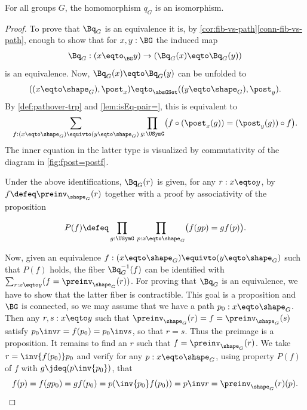 \begin{lemma}
  \label{lem:Groupsareidentitytypes}
For all groups $G$, the homomorphism $q_G$ is an isomorphism.
\end{lemma}
\begin{proof}
  To prove that $\Bq_G$ is an equivalence it is, by \cref{cor:fib-vs-path}\ref{conn-fib-vs-path}, enough to show that for $x,y:\BG$ the induced map
$$\Bq_G:(x\eqto_{\BG}y)\to (\Bq_G(x)\eqto \Bq_G(y))
$$
is an equivalence.
  Now, $\Bq_G(x)\eqto \Bq_G(y)$ can be unfolded to
$$
((x\eqto \sh_G),\post_x)\eqto_{\absGSet}((y\eqto\sh_G),\post_y).$$
By \cref{def:pathover-trp} and \cref{lem:isEq-pair=}, this is equivalent to
\[
\sum_{f:(x\eqto \sh_G)\equivto (y\eqto \sh_G)}
\prod_{g:\USymG} \bigl(f\circ(\post_x(g))=(\post_y(g))\circ f\bigr).
\]
The inner equation in the latter type is visualized by commutativity
of the diagram in \cref{fig:fpost=postf}.
\begin{marginfigure}
\caption{\label{fig:fpost=postf}
Equivalence $f$ commutes with $\post_-(g)$; 
commutation for all $g:\USymG$ is abbreviated by $P(f)$.}
\end{marginfigure}
Under the above identifications, $\Bq_G(r)$ is given, for any $r:x\eqto y$, by 
$f\defeq\preinv_{\sh_G}(r)$ together with a proof
by associativity of the proposition

\[
 P(f)\defeq \prod_{g:\USymG}\,\prod_{p:x\eqto\sh_G} \bigl(f(gp)= g f(p)\bigr).
\]

Now, given an equivalence $f:(x\eqto \sh_G)\equivto (y\eqto \sh_G)$ 
such that $P(f)$ holds, the fiber $\Bq_G^{-1}(f)$ can be identified with
$\sum_{r:x\eqto y}(f=\preinv_{\sh_G}(r))$. For proving that $\Bq_G$
is an equivalence, we have to show that the
latter fiber is contractible. This goal is a proposition
and $\BG$ is connected, so we may assume that we have a 
path $p_0:x\eqto\sh_G$. Then any $r,s:x\eqto y$ such that
$\preinv_{\sh_G}(r)= f=\preinv_{\sh_G}(s)$ satisfy $p_0\inv r=f(p_0)=p_0\inv s$,
so that $r=s$. Thus the preimage is a proposition. It remains
to find an $r$ such that $f=\preinv_{\sh_G}(r)$. 
We take $r=\inv{f(p_0)}p_0$ and verify for any $p:x\eqto\sh_G$, using
property $P(f)$ of $f$ with $g\jdeq(p\inv{p_0})$, that
\[
f(p) = f(g p_0) = g f(p_0) = p(\inv{p_0}f(p_0)) = p\inv r
= \preinv_{\sh_G}(r)(p).\qedhere
\]
\end{proof}

